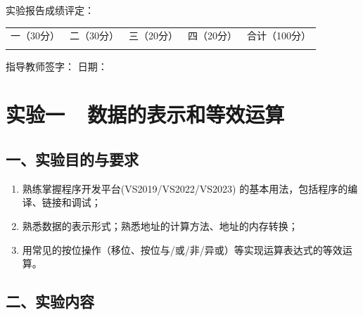 \documentclass[12pt,a4paper]{ctexart}
\begin{document}
\vspace{1cm}

\begin{center}
{\heiti 实验报告成绩评定：}

\vspace{0.5cm}

\begin{tabular}{|c|c|c|c|c|}
\hline
\multirow{2}{*}{一（30分）} & \multirow{2}{*}{二（30分）} & \multirow{2}{*}{三（20分）} & \multirow{2}{*}{四（20分）} & \multirow{2}{*}{合计（100分）} \\
& & & & \\
\hline
& & & & \\
\hline
\end{tabular}

\vspace{1.5cm}

指导教师签字：\hspace{4cm} \makebox[3cm]{\hrulefill} 日期：
\end{center}

\newpage

\setcounter{page}{1}
\section*{实验一\ \ 数据的表示和等效运算}

\subsection*{一、实验目的与要求}

\begin{enumerate}[label=（\arabic*）,nosep,leftmargin=*]
    \item 熟练掌握程序开发平台(VS2019/VS2022/VS2023) 的基本用法，包括程序的编译、链接和调试；
    \item 熟悉数据的表示形式；熟悉地址的计算方法、地址的内存转换；
    \item 用常见的按位操作（移位、按位与/或/非/异或）等实现运算表达式的等效运算。
\end{enumerate}

\subsection*{二、实验内容}
\end{document}
